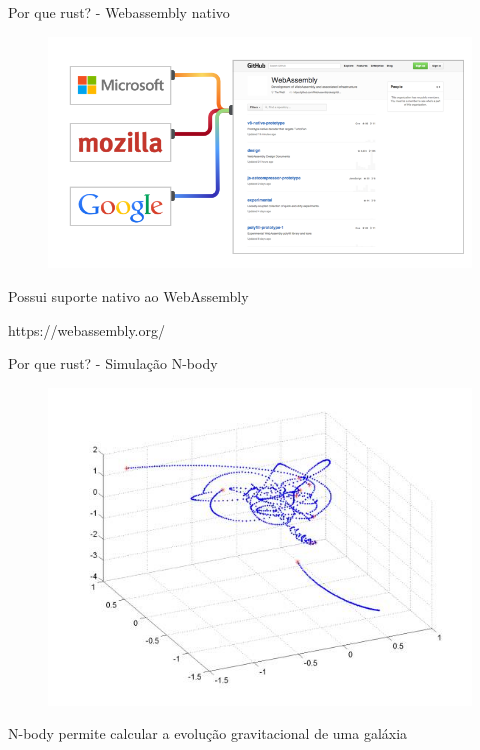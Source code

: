 \begin{frame}[fragile]{Por que rust? - Webassembly nativo}
\begin{figure}[ht!]
  \centering
  \includegraphics[scale=0.4]{images/webassembly.png}
\end{figure}
\begin{center}
\small{Possui suporte nativo ao WebAssembly}
\end{center}
\begin{center}
\small{https://webassembly.org/}
\end{center}
\end{frame}

\begin{frame}[fragile]{Por que rust? - Simulação N-body}
\begin{figure}[ht!]
  \centering
  \includegraphics[scale=0.6]{images/n-body.jpg}
\end{figure}
\begin{center}
\small{N-body permite calcular a evolução gravitacional de uma galáxia}
\end{center}
\end{frame}

